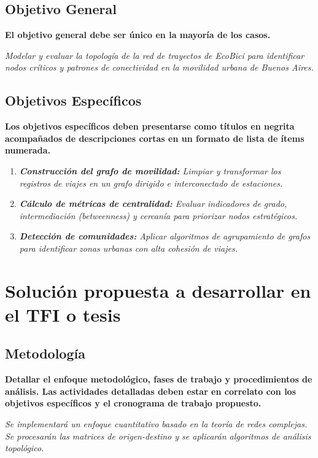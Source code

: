 \documentclass[12pt, a4paper]{article}
\begin{document}
\subsection{Objetivo General}
\textbf{El objetivo general debe ser único en la mayoría de los casos.}

\vspace{0.2cm}
\noindent \textit{Modelar y evaluar la topología de la red de trayectos de EcoBici para identificar nodos críticos y patrones de conectividad en la movilidad urbana de Buenos Aires.}

\subsection{Objetivos Específicos}
\textbf{Los objetivos específicos deben presentarse como títulos en negrita acompañados de descripciones cortas en un formato de lista de ítems numerada.}

\begin{enumerate}
    \item \textit{\textbf{Construcción del grafo de movilidad:} Limpiar y transformar los registros de viajes en un grafo dirigido e interconectado de estaciones.}
    \item \textit{\textbf{Cálculo de métricas de centralidad:} Evaluar indicadores de grado, intermediación (\textit{betweenness}) y cercanía para priorizar nodos estratégicos.}
    \item \textit{\textbf{Detección de comunidades:} Aplicar algoritmos de agrupamiento de grafos para identificar zonas urbanas con alta cohesión de viajes.}
\end{enumerate}

\section{Solución propuesta a desarrollar en el TFI o tesis}

\subsection{Metodología}
\textbf{Detallar el enfoque metodológico, fases de trabajo y procedimientos de análisis. Las actividades detalladas deben estar en correlato con los objetivos específicos y el cronograma de trabajo propuesto.}

\vspace{0.2cm}
\noindent \textit{Se implementará un enfoque cuantitativo basado en la teoría de redes complejas. Se procesarán las matrices de origen-destino y se aplicarán algoritmos de análisis topológico.}
\end{document}
